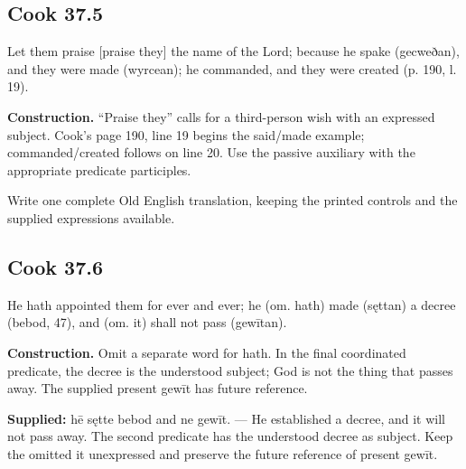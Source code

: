 \par\begin{minipage}{\linewidth}\raggedright
\subsection*{Cook 37.5}

Let them praise [praise they] the name of the Lord; because he spake (gecweðan), and they were made (wyrcean); he commanded, and they were created (p. 190, l. 19).

\textbf{Construction.} “Praise they” calls for a third-person wish with an expressed subject. Cook’s page 190, line 19 begins the said/\allowbreak{}made example; commanded/\allowbreak{}created follows on line 20. Use the passive auxiliary with the appropriate predicate participles.

Write one complete Old English translation, keeping the printed controls and the supplied expressions available.

\end{minipage}\par\addvspace{4pt}

\par\begin{minipage}{\linewidth}\raggedright
\subsection*{Cook 37.6}

He hath appointed them for ever and ever; he (om. hath) made (sęttan) a decree (bebod, 47), and (om. it) shall not pass (gewītan).

\end{minipage}\par\addvspace{4pt}

\textbf{Construction.} Omit a separate word for hath. In the final coordinated predicate, the decree is the understood subject; God is not the thing that passes away. The supplied present gewīt has future reference.

\textbf{Supplied:} hē sętte bebod and ne gewīt. — He established a decree, and it will not pass away. The second predicate has the understood decree as subject. Keep the omitted it unexpressed and preserve the future reference of present gewīt.


